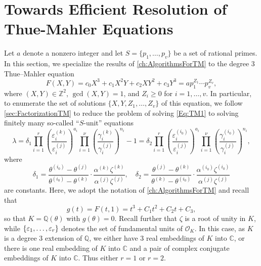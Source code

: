 
\chapter{Towards Efficient Resolution of Thue-Mahler Equations}
\label{ch:EfficientTMSolver}

Let $a$ denote a nonzero integer and let $S=\{p_1,\dotsc,p_v\}$ be a set of rational primes. In this section, we specialize the results of \autoref{ch:AlgorithmsForTM} to the degree $3$ Thue--Mahler equation
\begin{equation} \label{Eq:TM1}
F(X,Y) = c_0 X^3 + c_1 X^{2}Y + c_2XY^2 + c_3Y^3 = a p_1^{Z_1}\cdots p_v^{Z_v},
\end{equation}
where $(X,Y) \in \mathbb{Z}^2$, $\gcd(X,Y)=1$, and $Z_i \geq 0$ for $i = 1, \dots, v$. In particular, to enumerate the set of solutions $\{X,Y, Z_1, \dots, Z_v\}$ of this equation, we follow \autoref{sec:FactorizationTM} to reduce the problem of solving \eqref{Eq:TM1} to solving finitely many so-called ``$S$-unit'' equations
\begin{equation} \label{eq:EfficientSunit}
\lambda = \delta_1 \prod_{i = 1}^r\left( \frac{\varepsilon_i^{(k)}}{\varepsilon_i^{(j)}}\right)^{a_i}\prod_{i = 1}^{\nu} \left( \frac{\gamma_i^{(k)}}{\gamma_i^{(j)}}\right)^{n_i} - 1 = \delta_2 \prod_{i = 1}^{r}\left( \frac{\varepsilon_i^{(i_0)}}{\varepsilon_i^{(j)}}\right)^{a_i} \prod_{i = 1}^{\nu} \left( \frac{\gamma_i^{(i_0)}}{\gamma_i^{(j)}}\right)^{n_i},
\end{equation}
where
\[\delta_1 = \frac{\theta^{(i_0)} - \theta^{(j)}}{\theta^{(i_0)} - \theta^{(k)}}\cdot\frac{\alpha^{(k)}\zeta^{(k)}}{\alpha^{(j)}\zeta^{(j)}}, \quad \delta_2 = \frac{\theta^{(j)} - \theta^{(k)}}{\theta^{(k)} - \theta^{(i_0)}}\cdot \frac{\alpha^{(i_0)}\zeta^{(i_0)}}{\alpha^{(j)}\zeta^{(j)}}\]
are constants. Here, we adopt the notation of \autoref{ch:AlgorithmsForTM} and recall that 
\[g(t) = F(t,1) = t^3 + C_1t^2 + C_2t + C_3,\]
so that $K = \mathbb{Q}(\theta)$ with $g(\theta) = 0$. Recall further that $\zeta$ is a root of unity in $K$, while $\{\varepsilon_1, \dots, \varepsilon_r\}$ denotes the set of fundamental units of $\mathcal{O}_K$. In this case, as $K$ is a degree $3$ extension of $\mathbb{Q}$, we either have $3$ real embeddings of $K$ into $\mathbb{C}$, or there is one real embedding of $K$ into $\mathbb{C}$ and a pair of complex conjugate embeddings of $K$ into $\mathbb{C}$. Thus either $r = 1$ or $r = 2$. 

